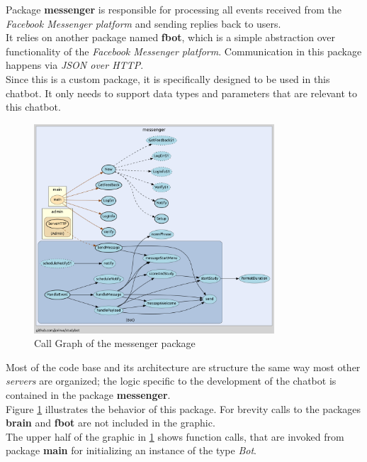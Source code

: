 Package \textbf{messenger} is responsible for processing all events received from the \emph{Facebook Messenger platform}
and sending replies back to users.
\\

It relies on another package named \textbf{fbot},
which is a simple abstraction over functionality of the \emph{Facebook Messenger platform}.
Communication in this package happens via \emph{JSON over HTTP}.
\\
Since this is a custom package,
it is specifically designed to be used in this chatbot.
It only needs to support data types and parameters that are relevant to this chatbot.
\\

\begin{figure}[h]
  \centering
  \includegraphics[width=0.8\textwidth]{images/call-graph-messenger.png}
	\caption{Call Graph of the messenger package\protect\footnotemark}
	\label{fig:call-graph-messenger}
\end{figure}


Most of the code base and its architecture are structure the same way most other \emph{servers} are organized;
the logic specific to the development of the chatbot is contained in the package \textbf{messenger}.
\\
Figure \ref{fig:call-graph-messenger} illustrates the behavior of this package.
For brevity calls to the packages \textbf{brain} and \textbf{fbot} are not included in the graphic.
\\
The upper half of the graphic in \ref{fig:call-graph-messenger} shows function calls,
that are invoked from package \textbf{main} for initializing an instance of the type \emph{Bot}.
\\

